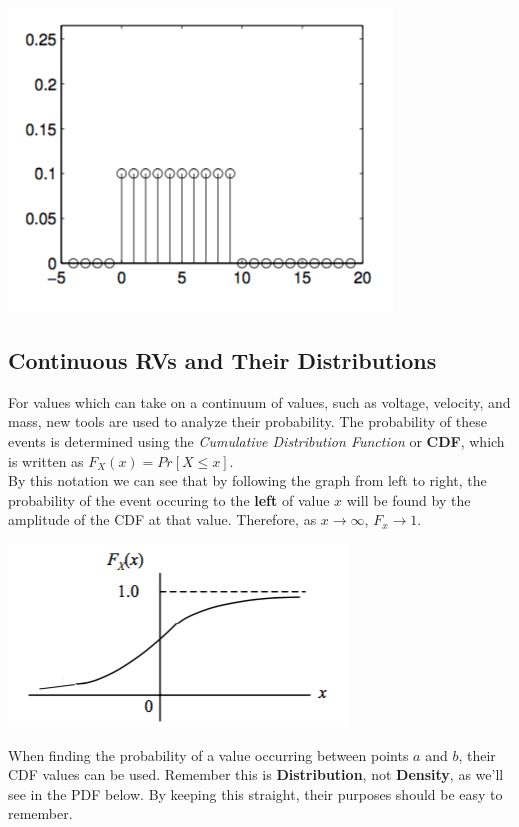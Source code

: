 \documentclass[11pt]{article}
\begin{document}
\begin{center}
    \includegraphics[width=300 px]{img/uniform} \\
\end{center}

\subsection{Continuous RVs and Their Distributions}

For values which can take on a continuum of values, such as voltage, velocity, and mass, new tools are used to analyze their probability. The probability of these events is determined using the \textit{Cumulative Distribution Function} or \textbf{CDF}, which is written as $F_X(x) = Pr[X \leq x]$. \\

By this notation we can see that by following the graph from left to right, the probability of the event occuring to the \textbf{left} of value $x$ will be found by the amplitude of the CDF at that value. Therefore, as $x \rightarrow \infty$, $F_x \rightarrow 1$. \\

\begin{center}
    \includegraphics[width=300 px]{img/cdf} \\
\end{center}

When finding the probability of a value occurring between points $a$ and $b$, their CDF values can be used. Remember this is \textbf{Distribution}, not \textbf{Density}, as we'll see in the PDF below. By keeping this straight, their purposes should be easy to remember. \\
\end{document}
